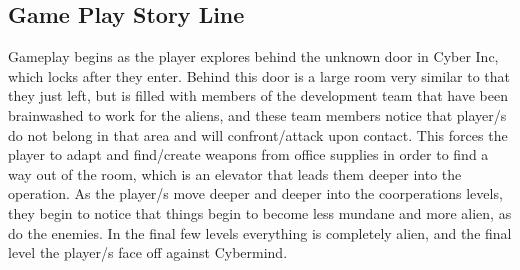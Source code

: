 \documentclass[11pt]{article}
\begin{document}
        \subsection{Game Play Story Line}
            Gameplay begins as the player explores behind the unknown door in Cyber Inc, which locks after they enter. Behind this door is a large room very similar to that they just left, but is filled with members of the development team that have been brainwashed to work for the aliens, and these team members notice that player/s do not belong in that area and will confront/attack upon contact. This forces the player to adapt and find/create weapons from office supplies in order to find a way out of the room, which is an elevator that leads them deeper into the operation. As the player/s move deeper and deeper into the coorperations levels, they begin to notice that things begin to become less mundane and more alien, as do the enemies. In the final few levels everything is completely alien, and the final level the player/s face off against Cybermind. 
        
    
\end{document}
